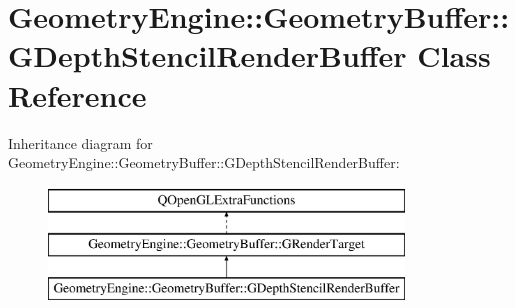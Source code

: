 \hypertarget{class_geometry_engine_1_1_geometry_buffer_1_1_g_depth_stencil_render_buffer}{}\section{Geometry\+Engine\+::Geometry\+Buffer\+::G\+Depth\+Stencil\+Render\+Buffer Class Reference}
\label{class_geometry_engine_1_1_geometry_buffer_1_1_g_depth_stencil_render_buffer}
Inheritance diagram for Geometry\+Engine\+::Geometry\+Buffer\+::G\+Depth\+Stencil\+Render\+Buffer\+:\begin{figure}[H]
\begin{center}
\leavevmode
\includegraphics[height=3.000000cm]{class_geometry_engine_1_1_geometry_buffer_1_1_g_depth_stencil_render_buffer}
\end{center}
\end{figure}
